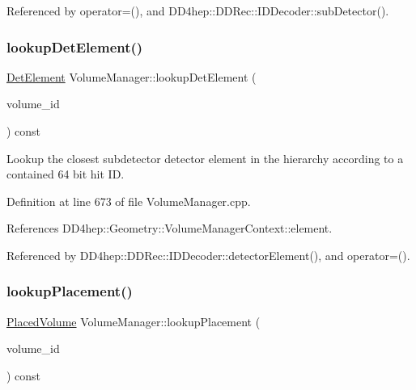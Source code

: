 Referenced by operator=(), and D\+D4hep\+::\+D\+D\+Rec\+::\+I\+D\+Decoder\+::sub\+Detector().

\hypertarget{class_d_d4hep_1_1_geometry_1_1_volume_manager_ab1be2614964d7ecc227ba03639e55894}{}\label{class_d_d4hep_1_1_geometry_1_1_volume_manager_ab1be2614964d7ecc227ba03639e55894} 
\subsubsection{\texorpdfstring{lookup\+Det\+Element()}{lookupDetElement()}}
{\footnotesize\ttfamily \hyperlink{class_d_d4hep_1_1_geometry_1_1_det_element}{Det\+Element} Volume\+Manager\+::lookup\+Det\+Element (\begin{DoxyParamCaption}\item[{\hyperlink{class_d_d4hep_1_1_geometry_1_1_volume_manager_ab1f746b561c93be38bc7c6e66fc8ca8a}{Volume\+ID}}]{volume\+\_\+id }\end{DoxyParamCaption}) const}



Lookup the closest subdetector detector element in the hierarchy according to a contained 64 bit hit ID. 



Definition at line 673 of file Volume\+Manager.\+cpp.



References D\+D4hep\+::\+Geometry\+::\+Volume\+Manager\+Context\+::element.



Referenced by D\+D4hep\+::\+D\+D\+Rec\+::\+I\+D\+Decoder\+::detector\+Element(), and operator=().

\hypertarget{class_d_d4hep_1_1_geometry_1_1_volume_manager_aff0f31cb3233b2ebf3d99e5769737e94}{}\label{class_d_d4hep_1_1_geometry_1_1_volume_manager_aff0f31cb3233b2ebf3d99e5769737e94} 
\subsubsection{\texorpdfstring{lookup\+Placement()}{lookupPlacement()}}
{\footnotesize\ttfamily \hyperlink{class_d_d4hep_1_1_geometry_1_1_placed_volume}{Placed\+Volume} Volume\+Manager\+::lookup\+Placement (\begin{DoxyParamCaption}\item[{\hyperlink{class_d_d4hep_1_1_geometry_1_1_volume_manager_ab1f746b561c93be38bc7c6e66fc8ca8a}{Volume\+ID}}]{volume\+\_\+id }\end{DoxyParamCaption}) const}



